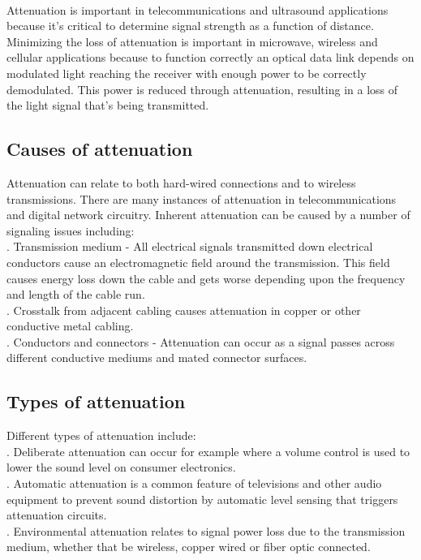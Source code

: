 \documentclass[12pt,a4paper]{article}%
\begin{document}
\begin{flushleft}
\begin{flushleft}
			\paragraph{}
			Attenuation is important in telecommunications and ultrasound applications because it’s critical to determine signal strength as a function of distance. Minimizing the loss of attenuation is important in microwave, wireless and cellular applications because to function correctly an optical data link depends on modulated light reaching the receiver with enough power to be correctly demodulated. This power is reduced through attenuation, resulting in a loss of the light signal that’s being transmitted.
		\end{flushleft}
		\subsection{ Causes of attenuation} 
		\begin{flushleft}
			Attenuation can relate to both hard-wired connections and to wireless transmissions. There are many instances of attenuation in telecommunications and digital network circuitry. Inherent attenuation can be caused by a number of signaling issues including:\\. Transmission medium - All electrical signals transmitted down electrical conductors cause an electromagnetic field around the transmission. This field causes energy loss down the cable and gets worse depending upon the frequency and length of the cable run. \\.  Crosstalk from adjacent cabling causes attenuation in copper or other conductive metal cabling.\\. Conductors and connectors - Attenuation can occur as a signal passes across different conductive mediums and mated connector surfaces.\\\bigskip
		\end{flushleft}
		\subsection{Types of attenuation} 
		\begin{flushleft}
			Different types of attenuation include:\\. Deliberate attenuation can occur for example where a volume control is used to lower the sound level on consumer electronics.\\. Automatic attenuation is a common feature of televisions and other audio equipment to prevent sound distortion by automatic level sensing that triggers attenuation circuits.\\. Environmental attenuation relates to signal power loss due to the transmission medium, whether that be wireless, copper wired or fiber optic connected.
		\end{flushleft}
		

\end{flushleft}
\end{document}
